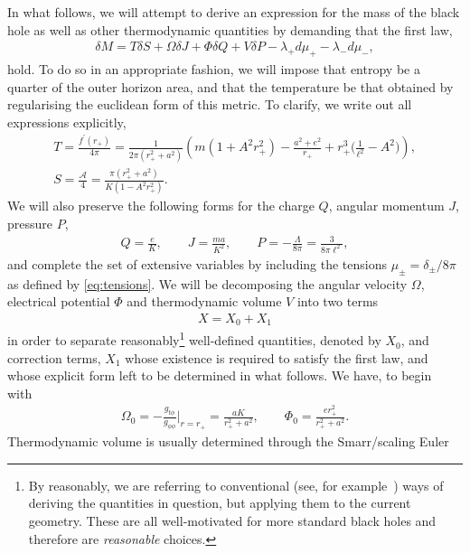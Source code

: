 \documentclass[
twoside,
openright,
frontopenright,
]{dmathesis}
\newcommand{\nn}{\nonumber}
\begin{document}
In what follows, we will attempt to derive an expression for the mass of the
black hole as well as other thermodynamic quantities by demanding that the first
law,
\begin{align}
  \label{eq:fullFLT}
  \delta M = T\delta S + \Omega \delta J + \Phi \delta Q + V \delta P  - \lambda_+
  d\mu_+ - \lambda_- d\mu_-,
\end{align}
hold. To do so in an appropriate fashion, we will impose that entropy be a quarter of
the outer horizon area, and that the temperature be that obtained by
regularising the euclidean form of this metric. To clarify, we write out all
expressions explicitly, 
\begin{gather}
  T= \frac{f^\prime (r_+)}{4\pi} = \frac{1}{2\pi(r_+^2+a^2)}\left(m(1+A^2r_+^2)
    - \frac{a^2+e^2}{r_+}+r_+^3\Big(\frac{1}{\ell^2}-A^2\Big)\right), \nn\\ 
  S = \frac{\mathcal{A}}{4} = \frac{\pi(r_+^2+a^2)}{K(1-A^2 r_+^2)}.
  \label{eq:TS}
\end{gather}
We will also preserve the following forms for the charge $Q$, angular momentum
$J$, pressure $P$,
\begin{gather}
  \label{eq:QJP} Q=\frac{e}{K}, \qquad J = \frac{m a}{K^2}, \qquad P =
  -\frac{\Lambda}{8\pi} = \frac{3}{8\pi \ell^2},
\end{gather}
and complete the set of extensive variables by including the tensions
$\mu_\pm=\delta_\pm/8\pi$ as defined by \cref{eq:tensions}. We will be
decomposing the angular velocity $\Omega$, electrical potential $\Phi$ and
thermodynamic volume $V$ into two terms
\begin{align}
  \label{eq:X}
  X=X_0+X_1 
\end{align}
in order to separate reasonably\footnote{By reasonably, we are referring to
  conventional (see, for example~\cite{Gibbons:2004ai}) ways of deriving the
  quantities in question, but applying them to the current geometry. These are
  all well-motivated for more standard black holes and therefore are
  \emph{reasonable} choices.} well-defined quantities, denoted by $X_0$, and
correction terms, $X_1$ whose existence is required to satisfy the first law,
and whose explicit form left to be determined in what follows. We have, to
begin with~\cite{Caldarelli:1999xj}
\begin{gather}\label{eq:OP0}
\Omega_0 = -\frac{g_{t\phi}}{g_{\phi\phi}}\bigg|_{r=r_+} = \frac{a
  K}{r_+^2+a^2}, \qquad \Phi_0 = \frac{e r_+^2}{r_+^2+a^2}. 
\end{gather}
Thermodynamic volume is usually determined through the Smarr/scaling Euler
\end{document}
